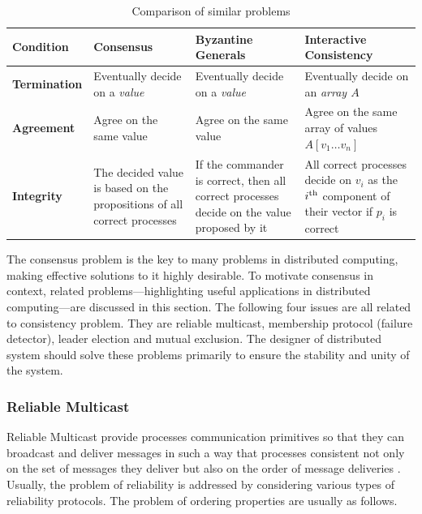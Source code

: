 \documentclass[12pt, a4paper]{article}
\begin{document}
\begin{table}[htp]
  \centering
  \begin{tabularx}{\linewidth}{%
    l%
    >{\raggedright\arraybackslash}X%
    >{\raggedright\arraybackslash}X%
    >{\raggedright\arraybackslash}X}
  \toprule
  Condition & Consensus & Byzantine Generals & Interactive Consistency \\
  \midrule
  \textbf{Termination} & Eventually decide on a \textit{value}
    & Eventually decide on a \textit{value}
    & Eventually decide on an \textit{array $A$} \\
  \addlinespace
  \textbf{Agreement} & Agree on the same value
    & Agree on the same value
    & Agree on the same array of values $A[v_{1} \ldots v_{n}]$ \\
  \addlinespace
  \textbf{Integrity}
    & The decided value is based on the propositions of all correct processes
    & If the commander is correct, then all correct processes decide on the
      value proposed by it
    & All correct processes decide on $v_{i}$ as the $i\textsuperscript{th}$
      component of their vector if $p_{i}$ is correct \\
  \bottomrule
\end{tabularx}
  \caption{Comparison of similar problems}
  \label{tab:dbtap}
\end{table}

The consensus problem is the key to many problems in distributed computing, 
making effective solutions to it highly desirable\cite{fritzke2001consensus}. To 
motivate consensus in context, related problems—highlighting useful applications 
in distributed computing—are discussed in this section. The following four 
issues are all related to consistency problem. They are reliable multicast, 
membership protocol (failure detector), leader election and mutual exclusion. 
The designer of distributed system should solve these problems primarily to 
ensure the stability and unity of the system.

\subsubsection{Reliable Multicast}

Reliable Multicast provide processes communication primitives so that they can 
broadcast and deliver messages in such a way that processes consistent not only 
on the set of messages they deliver but also on the order of message deliveries
\cite{fritzke2001consensus}. Usually, the problem of reliability is addressed by 
considering various types of reliability protocols. The problem of ordering 
properties are usually as follows.\cite{garcia1991ordered}
\end{document}

